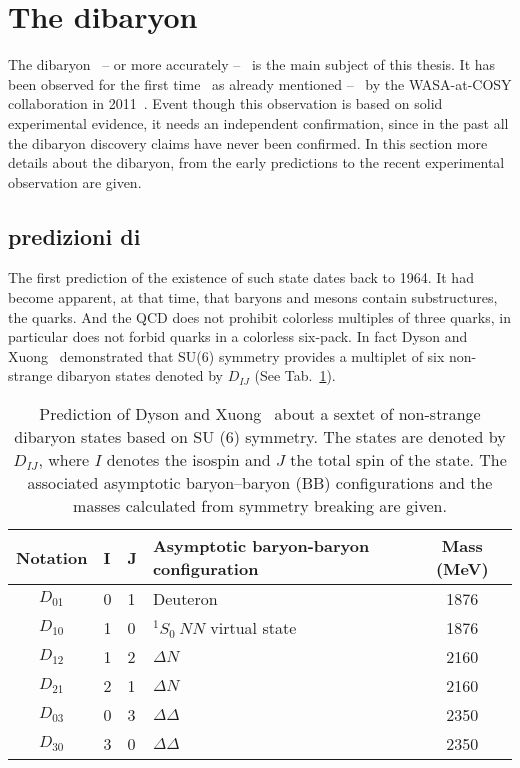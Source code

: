 %
%
\section{The \dst dibaryon} \label{sec:2.2}

The \ds dibaryon \ -- or more accurately \dst -- \ is the main subject of this thesis.
It has been observed for the first time \ as already mentioned -- \ by the WASA-at-COSY 
collaboration in 2011~\cite{wasa1}.
Event though this observation is based on solid experimental evidence, it needs an independent
confirmation, since in the past all the dibaryon discovery claims have never been confirmed.
In this section more details about the \ds dibaryon, from the early predictions to the 
recent experimental observation are given.

%
\subsection{predizioni di \ds} \label{sec:2.2.1}

The first prediction of the existence of such state dates back to 1964. 
It had become apparent, at that time, that baryons and mesons contain substructures, the quarks.
And the QCD does not prohibit colorless multiples of three quarks, in particular does not forbid 
quarks in a colorless six-pack. In fact Dyson and Xuong~\cite{dysonxuong} demonstrated that SU(6)
symmetry provides a multiplet of six non-strange dibaryon states denoted by $D_{IJ}$ 
(See Tab.~\ref{tab:dibaryons}).

\begingroup
\renewcommand{\arraystretch}{1.5} %
\begin{table}
\centering
\begin{tabularx}{\textwidth}{cXXlc}
\toprule
\textbf{Notation}    &   \textbf{I}   &   \textbf{J}   &   \textbf{Asymptotic baryon-baryon configuration}            &\textbf{Mass (MeV)} \\
\midrule
$D_{01}$    &   0   &   1   &   \qquad \qquad Deuteron                            &   1876    \\
$D_{10}$    &   1   &   0   &   \qquad \qquad $^{1}S_{0}\ NN$ virtual state       &   1876    \\ 
$D_{12}$    &   1   &   2   &   \qquad \qquad $\Delta N$                          &   2160    \\
$D_{21}$    &   2   &   1   &   \qquad \qquad $\Delta N$                          &   2160    \\
$D_{03}$    &   0   &   3   &   \qquad \qquad $\Delta \Delta$                     &   2350    \\
$D_{30}$    &   3   &   0   &   \qquad \qquad $\Delta \Delta$                     &   2350    \\
\midrule
\end{tabularx}
\caption{Prediction of Dyson and Xuong~\cite{dysonxuong} about a sextet of non-strange dibaryon states based on SU (6) symmetry. The states are denoted by $D_{IJ}$, where $I$ denotes the isospin and $J$ the total spin of the state. The associated asymptotic baryon–baryon (BB) configurations and the masses calculated from symmetry breaking are given.}
\label{tab:dibaryons}
\end{table}
\endgroup

